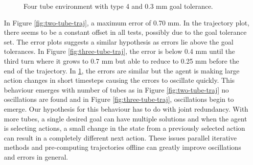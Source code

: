\begin{figure}
    \caption{Four tube environment with type 4 and 0.3 mm goal tolerance.}
    \label{fig:four-tube-traj}
\end{figure}

In Figure \ref{fig:two-tube-traj}, a maximum error of 0.70 mm. In the trajectory plot, there seems to be a constant offset in all tests, possibly due to the goal tolerance set. The error plots suggests a similar hypothesis as errors lie above the goal tolerances. In Figure \ref{fig:three-tube-traj}, the error is below 0.4 mm until the third turn where it grows to 0.7 mm but able to reduce to 0.25 mm before the end of the trajectory. In \ref{fig:four-tube-traj}, the errors are similar but the agent is making large action changes in short timesteps causing the errors to oscillate quickly. This behaviour emerges with number of tubes as in Figure \ref{fig:two-tube-traj} no oscillations are found and in Figure \ref{fig:three-tube-traj}, oscillations begin to emerge. Our hypothesis for this behaviour has to do with joint redundancy. With more tubes, a single desired goal can have multiple solutions and when the agent is selecting actions, a small change in the state from a previously selected action can result in a completely different next action. These issues parallel iterative methods and pre-computing trajectories offline can greatly improve oscillations and errors in general.



